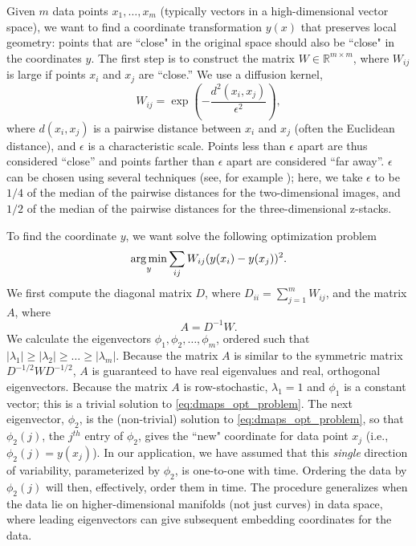 Given $m$ data points $x_1, \dots, x_m$ (typically vectors in a high-dimensional vector space), we want to find a coordinate transformation $y(x)$ that preserves local geometry: points that are ``close" in the original space should also be ``close" in the coordinates $y$.
%
The first step is to construct the matrix $W \in \mathbb{R}^{m \times m}$, where $W_{ij}$ is large if points $x_i$ and $x_j$ are ``close.''
%
We use a diffusion kernel,
\begin{equation} \label{eq:dmaps_W}
W_{ij} = \exp \left( -\frac{d^2(x_i, x_j)}{\epsilon^2} \right),
\end{equation}
where $d(x_i, x_j)$ is a pairwise distance between $x_i$ and $x_j$ (often the Euclidean distance), and $\epsilon$ is a characteristic scale.
%
Points less than $\epsilon$ apart are thus considered ``close'' and points farther than $\epsilon$ apart are considered ``far away''.
%
$\epsilon$ can be chosen using several techniques (see, for example \citep{coifman2008graph, rohrdanz2011determination}); here, we take $\epsilon$ to be $1/4$ of the median of the pairwise distances for the two-dimensional images, and $1/2$ of the median of the pairwise distances for the three-dimensional z-stacks.

To find the coordinate $y$, we want solve the following optimization problem \citep{Belkin2003}
\begin{equation} \label{eq:dmaps_opt_problem}
\operatorname*{arg\,min}_{y} \sum_{ij} W_{ij} (y(x_i) - y(x_j))^2.
\end{equation}
%
We first compute the diagonal matrix $D$, where $D_{ii} = \sum_{j=1}^{m} W_{ij}$, and the matrix $A$, where
\begin{equation} \label{eq:dmaps_A}
A = D^{-1} W.
\end{equation}
%
We calculate the eigenvectors $\phi_1, \phi_2, \dots, \phi_m$, ordered such that $|\lambda_1| \ge |\lambda_2| \ge \dots \ge |\lambda_m|$.
%
Because the matrix $A$ is similar to the symmetric matrix $D^{-1/2} W D^{-1/2}$, $A$ is guaranteed to have real eigenvalues and real, orthogonal eigenvectors.
%
Because the matrix $A$ is row-stochastic, $\lambda_1=1$ and $\phi_1$ is a constant vector; this is a trivial solution to \eqref{eq:dmaps_opt_problem}.
%
%
The next eigenvector, $\phi_2$, is the (non-trivial) solution to \eqref{eq:dmaps_opt_problem}, so that $\phi_2(j)$, the $j^{th}$ entry of $\phi_2$, gives the ``new" coordinate for data point $x_j$ (i.e., $\phi_2(j) = y(x_j)$).
%
In our application, we have assumed that this {\em single} direction of variability, parameterized by $\phi_2$, is one-to-one with time.
%
Ordering the data by $\phi_2(j)$ will then, effectively, order them in time.
%
The procedure generalizes when the data lie on higher-dimensional manifolds (not just curves) in data space, where leading eigenvectors can give subsequent embedding coordinates for the data.
%

